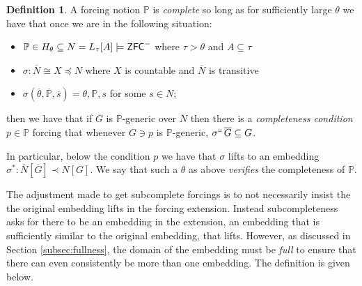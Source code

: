 \documentclass{amsart}
\theoremstyle{definition}
\newtheorem{definition}[theorem]{Definition}
\theoremstyle{remark}
\renewcommand{\P}{\mathbb{P}}
\newcommand{\N}{{\overline{N}}}
\newcommand{\G}{\overline{G}}
\newcommand{\ZFC}{\textup{\ensuremath{\textsf{ZFC}}}}
\begin{document}
\begin{definition} A forcing notion $\P$ is \emph{complete} so long as
for sufficiently large $\theta$ we have that once we are in the following situation: \begin{itemize}
	\item $\P \in H_\theta \subseteq N = L_\tau[A] \models \ZFC^-$ where $\tau>\theta$ and $A \subseteq \tau$
	\item $\sigma: \N \cong X \preccurlyeq N$ where $X$ is countable and $\N$ is transitive
	\item $\sigma(\overline \theta, \overline{\P}, \overline s)=\theta, \P, s$ for some $s \in N$;
\end{itemize}
then we have that if $\G$ is $\overline{\P}$-generic over $\N$ then there is a \emph{completeness condition} $p \in \P$ forcing that whenever $G \ni p$ is $\P$-generic, $\sigma ``\, \G \subseteq G$. 

In particular, below the condition $p$ we have that $\sigma$ lifts to an embedding $\sigma^*:\N[\G] \prec N[G]$.
We say that such a $\theta$ as above \emph{verifies} the completeness of $\P$.
\end{definition}
The adjustment made to get subcomplete forcings is to not necessarily insist the the original embedding lifts in the forcing extension. Instead subcompleteness asks for there to be an embedding in the extension, an embedding that is sufficiently similar to the original embedding, that lifts. However, as discussed in Section \ref{subsec:fullness}, the domain of the embedding must be \emph{full} to ensure that there can even consistently be more than one embedding. The definition is given below.
\end{document}
